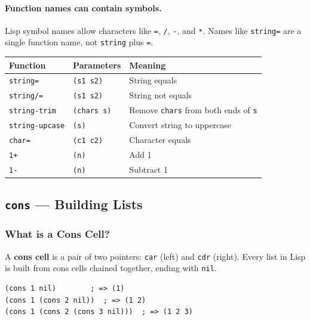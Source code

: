 \paragraph{Function names can contain symbols.}

Lisp symbol names allow characters like \texttt{=}, \texttt{/},
\texttt{-}, and \texttt{*}. Names like \texttt{string=} are a
single function name, not \texttt{string} plus \texttt{=}.

\begin{center}
\begin{tabular}{lll}
  \toprule
  \textbf{Function} & \textbf{Parameters} & \textbf{Meaning} \\
  \midrule
  \texttt{string=}       & \texttt{(s1 s2)}  & String equals \\
  \texttt{string/=}      & \texttt{(s1 s2)}  & String not equals \\
  \texttt{string-trim}   & \texttt{(chars s)} & Remove \texttt{chars} from both ends of \texttt{s} \\
  \texttt{string-upcase} & \texttt{(s)}      & Convert string to uppercase \\
  \texttt{char=}         & \texttt{(c1 c2)}  & Character equals \\
  \texttt{1+}            & \texttt{(n)}      & Add 1 \\
  \texttt{1-}            & \texttt{(n)}      & Subtract 1 \\
  \bottomrule
\end{tabular}
\end{center}

\subsection{\texttt{cons} --- Building Lists}

\subsubsection{What is a Cons Cell?}

A \textbf{cons cell} is a pair of two pointers: \texttt{car} (left)
and \texttt{cdr} (right). Every list in Lisp is built from cons cells
chained together, ending with \texttt{nil}.

\begin{lstlisting}
(cons 1 nil)        ; => (1)
(cons 1 (cons 2 nil))  ; => (1 2)
(cons 1 (cons 2 (cons 3 nil)))  ; => (1 2 3)
\end{lstlisting}

